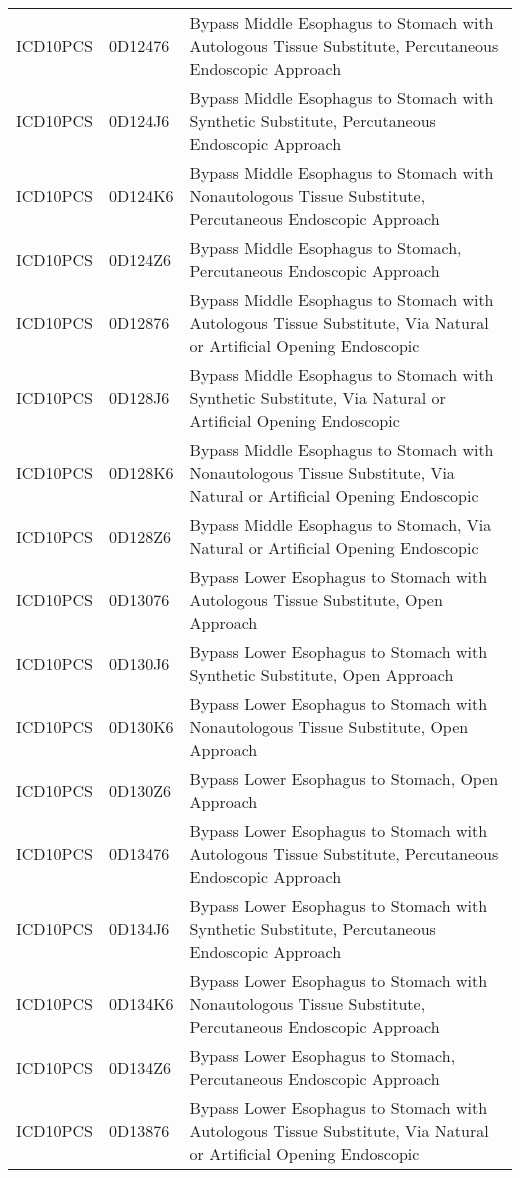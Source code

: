 \begin{longtable}{p{}p{}p{}}
  ICD10PCS & 0D12476 & Bypass Middle Esophagus to Stomach with Autologous Tissue Substitute, Percutaneous Endoscopic Approach \\ 
  ICD10PCS & 0D124J6 & Bypass Middle Esophagus to Stomach with Synthetic Substitute, Percutaneous Endoscopic Approach \\ 
  ICD10PCS & 0D124K6 & Bypass Middle Esophagus to Stomach with Nonautologous Tissue Substitute, Percutaneous Endoscopic Approach \\ 
  ICD10PCS & 0D124Z6 & Bypass Middle Esophagus to Stomach, Percutaneous Endoscopic Approach \\ 
  ICD10PCS & 0D12876 & Bypass Middle Esophagus to Stomach with Autologous Tissue Substitute, Via Natural or Artificial Opening Endoscopic \\ 
  ICD10PCS & 0D128J6 & Bypass Middle Esophagus to Stomach with Synthetic Substitute, Via Natural or Artificial Opening Endoscopic \\ 
  ICD10PCS & 0D128K6 & Bypass Middle Esophagus to Stomach with Nonautologous Tissue Substitute, Via Natural or Artificial Opening Endoscopic \\ 
  ICD10PCS & 0D128Z6 & Bypass Middle Esophagus to Stomach, Via Natural or Artificial Opening Endoscopic \\ 
  ICD10PCS & 0D13076 & Bypass Lower Esophagus to Stomach with Autologous Tissue Substitute, Open Approach \\ 
  ICD10PCS & 0D130J6 & Bypass Lower Esophagus to Stomach with Synthetic Substitute, Open Approach \\ 
  ICD10PCS & 0D130K6 & Bypass Lower Esophagus to Stomach with Nonautologous Tissue Substitute, Open Approach \\ 
  ICD10PCS & 0D130Z6 & Bypass Lower Esophagus to Stomach, Open Approach \\ 
  ICD10PCS & 0D13476 & Bypass Lower Esophagus to Stomach with Autologous Tissue Substitute, Percutaneous Endoscopic Approach \\ 
  ICD10PCS & 0D134J6 & Bypass Lower Esophagus to Stomach with Synthetic Substitute, Percutaneous Endoscopic Approach \\ 
  ICD10PCS & 0D134K6 & Bypass Lower Esophagus to Stomach with Nonautologous Tissue Substitute, Percutaneous Endoscopic Approach \\ 
  ICD10PCS & 0D134Z6 & Bypass Lower Esophagus to Stomach, Percutaneous Endoscopic Approach \\ 
  ICD10PCS & 0D13876 & Bypass Lower Esophagus to Stomach with Autologous Tissue Substitute, Via Natural or Artificial Opening Endoscopic \\ 

\end{longtable}
